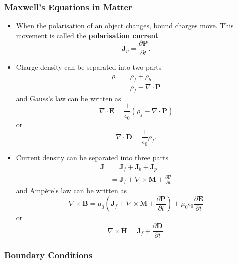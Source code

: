\documentclass{article}
\renewcommand{\vec}[1]{\boldsymbol{\mathbf{#1}}}
\begin{document}
\setcounter{subsubsection}{4}
\subsubsection{Maxwell's Equations in Matter}

\begin{itemize}
  \item When the polarisation of an object changes, bound charges move. This movement is called the \textbf{polarisation current} \[\vec{J}_p = \frac{\partial \vec{P}}{\partial t}.\]

  \item Charge density can be separated into two parts \begin{align*}
          \rho & = \rho_f + \rho_b               \\
               & = \rho_f - \nabla \cdot \vec{P}
        \end{align*} and Gauss's law can be written as \[\nabla \cdot \vec{E} = \frac{1}{\epsilon_0} (\rho_f - \nabla \cdot \vec{P})\] or \[\nabla \cdot \vec{D} = \frac{1}{\epsilon_0} \rho_f.\]

  \item Current density can be separated into three parts \begin{align*}
          \vec{J} & = \vec{J}_f + \vec{J}_b + \vec{J}_p                                       \\
                  & = \vec{J}_f + \nabla \times \vec{M} + \frac{\partial \vec{P}}{\partial t}
        \end{align*} and Ampère's law can be written as \[\nabla \times \vec{B} = \mu_0 \left( \vec{J}_f + \nabla \times \vec{M} + \frac{\partial \vec{P}}{\partial t} \right) + \mu_0 \epsilon_0 \frac{\partial \vec{E}}{\partial t}\] or \[\nabla \times \vec{H} = \vec{J}_f + \frac{\partial \vec{D}}{\partial t}.\]
\end{itemize}

\subsubsection{Boundary Conditions}
\end{document}
